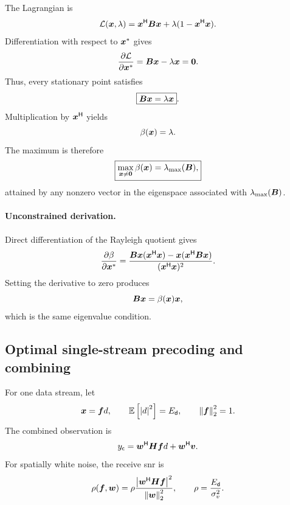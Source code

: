 The Lagrangian is
\begin{equation*}
	\mathcal{L}(\bm{x},\lambda)
	={\bm{x}}^{\mathsf{H}}\bm{B}\bm{x}
	+\lambda(1-{\bm{x}}^{\mathsf{H}}\bm{x}).
\end{equation*}
Differentiation with respect to ${\bm{x}}^{*}$ gives
\begin{equation*}
	\frac{\partial\mathcal{L}}
	{\partial{\bm{x}}^{*}}
	=\bm{B}\bm{x}-\lambda\bm{x}
	=\bm{0}.
\end{equation*}
Thus, every stationary point satisfies
\begin{equation*}
	\boxed{\bm{B}\bm{x}=\lambda\bm{x}}.
\end{equation*}
Multiplication by ${\bm{x}}^{\mathsf{H}}$ yields
\begin{equation*}
	\beta(\bm{x})=\lambda.
\end{equation*}
The maximum is therefore
\begin{equation}\label{eq:app-rayleigh}
	\boxed{
		\max_{\bm{x}\neq\bm{0}}\beta(\bm{x})
		=\lambda_{\max}(\bm{B}),
	}
\end{equation}
attained by any nonzero vector in the eigenspace
associated with $\lambda_{\max}(\bm{B})$.

\paragraph{Unconstrained derivation.}
Direct differentiation of the Rayleigh quotient gives
\begin{equation*}
	\frac{\partial\beta}
	{\partial{\bm{x}}^{*}}
	=
	\frac{
		\bm{B}\bm{x}({\bm{x}}^{\mathsf{H}}\bm{x})
		-\bm{x}({\bm{x}}^{\mathsf{H}}\bm{B}\bm{x})
	}{({\bm{x}}^{\mathsf{H}}\bm{x})^2}.
\end{equation*}
Setting the derivative to zero produces
\begin{equation*}
	\bm{B}\bm{x}
	=\beta(\bm{x})\bm{x},
\end{equation*}
which is the same eigenvalue condition.


\subsection{Optimal single-stream precoding and combining}
\label{app:single-stream}

For one data stream, let
\begin{equation*}
	\bm{x}=\bm{f}d,
	\qquad
	\mathbb{E}\left[\left|d\right|^2\right]=E_{\mathsf{d}},
	\qquad
	\left\|\bm{f}\right\|_2^2=1.
\end{equation*}
The combined observation is
\begin{equation*}
	y_{\mathsf c}
	={\bm{w}}^{\mathsf{H}}\bm{H}\bm{f}d
	+{\bm{w}}^{\mathsf{H}}\bm{v}.
\end{equation*}
For spatially white noise, the receive \ac{snr} is
\begin{equation}\label{eq:app-single-snr}
	\rho(\bm{f},\bm{w})
	=\rho
	\frac{\left|{\bm{w}}^{\mathsf{H}}\bm{H}\bm{f}\right|^2}
	{\left\|\bm{w}\right\|_2^2},
	\qquad
	\rho=\frac{E_{\mathsf{d}}}{\sigma_v^2}.
\end{equation}

